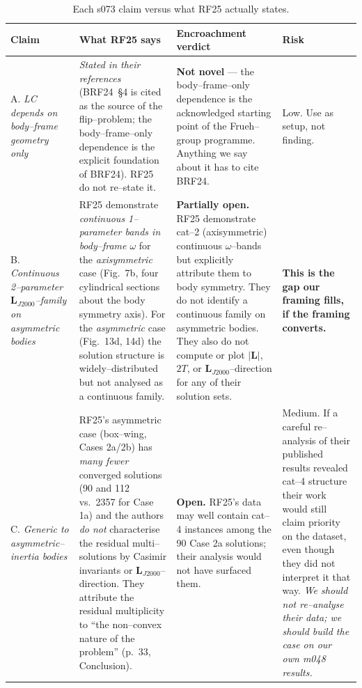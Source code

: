 \documentclass[11pt]{article}
\newcommand{\Lvec}{\mathbf{L}}
\newcommand{\LJ}{\Lvec_{J2000}}
\begin{document}
\begin{table}[h]
\centering
\small
\caption{Each s073 claim versus what RF25 actually states.}
\label{tab:encroachment}
\begin{tabularx}{\linewidth}{@{} l X X l @{}}
\toprule
\textbf{Claim} & \textbf{What RF25 says} & \textbf{Encroachment verdict}
& \textbf{Risk} \\
\midrule

A. \emph{LC depends on body--frame geometry only}
& \emph{Stated in their references} (BRF24~\S4 is cited as the source of the
flip--problem; the body--frame--only dependence is the explicit foundation of
BRF24). RF25 do not re--state it.
& \textbf{Not novel} --- the body--frame--only dependence is the
acknowledged starting point of the Frueh--group programme. Anything we say
about it has to cite BRF24.
& Low. Use as setup, not finding.
\\[6pt]

B. \emph{Continuous 2--parameter $\LJ$--family on asymmetric bodies}
& RF25 demonstrate \emph{continuous 1--parameter bands in body--frame
$\omega$} for the \emph{axisymmetric} case (Fig.~7b, four cylindrical
sections about the body symmetry axis). For the \emph{asymmetric} case
(Fig.~13d, 14d) the solution structure is widely--distributed but not
analysed as a continuous family.
& \textbf{Partially open.} RF25 demonstrate cat--2 (axisymmetric) continuous
$\omega$--bands but explicitly attribute them to body symmetry. They do not
identify a continuous family on asymmetric bodies. They also do not compute
or plot $|\Lvec|$, $2T$, or $\LJ$--direction for any of their solution sets.
& \textbf{This is the gap our framing fills, if the framing converts.}
\\[6pt]

C. \emph{Generic to asymmetric--inertia bodies}
& RF25's asymmetric case (box--wing, Cases 2a/2b) has \emph{many fewer}
converged solutions (90 and 112 vs.\ 2357 for Case 1a) and the authors
\emph{do not} characterise the residual multi--solutions by Casimir
invariants or $\LJ$--direction. They attribute the residual multiplicity
to ``the non--convex nature of the problem'' (p.~33, Conclusion).
& \textbf{Open.} RF25's data may well contain cat--4 instances among
the 90 Case 2a solutions; their analysis would not have surfaced them.
& Medium. If a careful re--analysis of their published results revealed
cat--4 structure their work would still claim priority on the dataset,
even though they did not interpret it that way. \emph{We should not
re--analyse their data; we should build the case on our own m048 results.}
\\

\bottomrule
\end{tabularx}
\end{table}
\end{document}
